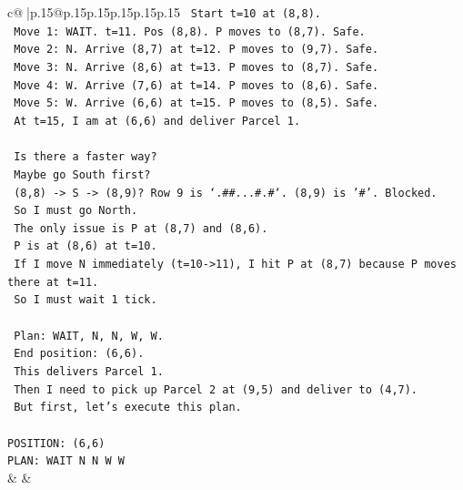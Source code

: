 \documentclass{article}
\begin{document}
{\begin{supertabular}{c@{$\;$}|p{.15\linewidth}@{}p{.15\linewidth}p{.15\linewidth}p{.15\linewidth}p{.15\linewidth}p{.15\linewidth}}
{{{\texttt{      Start t=10 at (8,8).} \\
\texttt{      Move 1: WAIT. t=11. Pos (8,8). P moves to (8,7). Safe.} \\
\texttt{      Move 2: N. Arrive (8,7) at t=12. P moves to (9,7). Safe.} \\
\texttt{      Move 3: N. Arrive (8,6) at t=13. P moves to (8,7). Safe.} \\
\texttt{      Move 4: W. Arrive (7,6) at t=14. P moves to (8,6). Safe.} \\
\texttt{      Move 5: W. Arrive (6,6) at t=15. P moves to (8,5). Safe.} \\
\texttt{      At t=15, I am at (6,6) and deliver Parcel 1.} \\
\\ 
\texttt{      Is there a faster way?} \\
\texttt{      Maybe go South first?} \\
\texttt{      (8,8) {-}> S {-}> (8,9)? Row 9 is `.\#\#...\#.\#`. (8,9) is '\#'. Blocked.} \\
\texttt{      So I must go North.} \\
\texttt{      The only issue is P at (8,7) and (8,6).} \\
\texttt{      P is at (8,6) at t=10.} \\
\texttt{      If I move N immediately (t=10{-}>11), I hit P at (8,7) because P moves there at t=11.} \\
\texttt{      So I must wait 1 tick.} \\
\\ 
\texttt{      Plan: WAIT, N, N, W, W.} \\
\texttt{      End position: (6,6).} \\
\texttt{      This delivers Parcel 1.} \\
\texttt{      Then I need to pick up Parcel 2 at (9,5) and deliver to (4,7).} \\
\texttt{      But first, let's execute this plan.} \\
\\ 
\texttt{POSITION: (6,6)} \\
\texttt{PLAN: WAIT N N W W} \\
            }
        }
    }
    & & \\ \\


\end{supertabular}}
\end{document}
